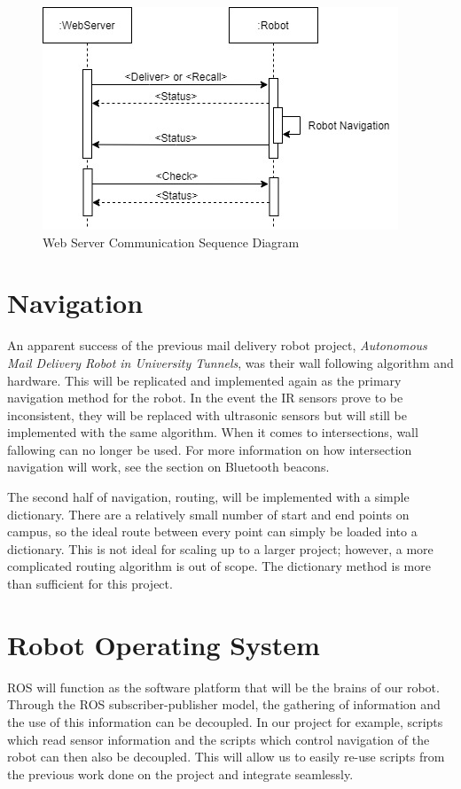 \documentclass[12pt]{report}
\begin{document}
\begin{figure}[H]
\caption{Web Server Communication Sequence Diagram}
\centering
\includegraphics[scale=0.8]{images/CommunicationSequenceDiagram.jpg}
\centering
\end{figure}


\section{Navigation}
An apparent success of the previous mail delivery robot project, \textit{Autonomous Mail Delivery Robot in University Tunnels}, was their wall following algorithm and hardware. This will be replicated and implemented again as the primary navigation method for the robot. In the event the IR sensors prove to be inconsistent, they will be replaced with ultrasonic sensors but will still be implemented with the same algorithm. When it comes to intersections, wall fallowing can no longer be used. For more information on how intersection navigation will work, see the section on Bluetooth beacons.

The second half of navigation, routing, will be implemented with a simple dictionary. There are a relatively small number of start and end points on campus, so the ideal route between every point can simply be loaded into a dictionary. This is not ideal for scaling up to a larger project; however, a more complicated routing algorithm is out of scope. The dictionary method is more than sufficient for this project.


\section{Robot Operating System}
ROS will function as the software platform that will be the brains of our robot. Through the ROS subscriber-publisher model, the gathering of information and the use of this information can be decoupled. In our project for example, scripts which read sensor information and the scripts which control navigation of the robot can then also be decoupled. This will allow us to easily re-use scripts from the previous work done on the project and integrate seamlessly.
\end{document}
